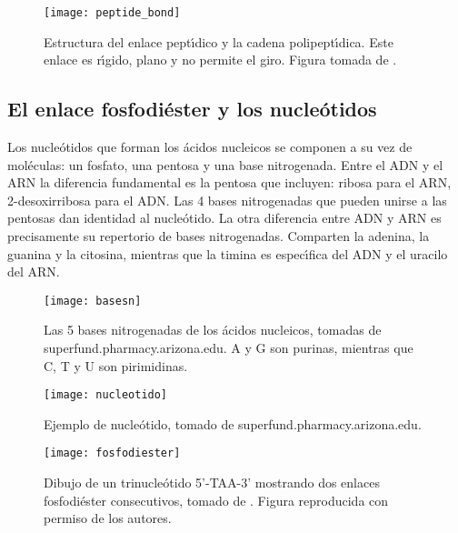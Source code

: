 \begin{figure}
\begin{center} 
\texttt{[image: peptide\_bond]}
\caption%
{
Estructura del enlace pept\'\i{}dico y la cadena polipept\'\i{}dica. Este enlace es r\'\i{}gido, plano y no permite el giro.
Figura tomada de .
}
\label{fig:peptide_bond}
\end{center}
\end{figure}



\subsection{El enlace fosfodi\'{e}ster y los nucle\'{o}tidos} \label{nts}
Los nucle\'{o}tidos que forman los \'{a}cidos nucleicos se componen a su vez de mol\'{e}culas: un fosfato, una pentosa y una 
base nitrogenada. Entre el ADN y el ARN la diferencia fundamental es la pentosa que incluyen: ribosa para el ARN, 
2-desoxirribosa para el ADN. Las 4 bases nitrogenadas que pueden unirse a las pentosas dan identidad al nucle\'{o}tido.
La otra diferencia entre ADN y ARN es precisamente su repertorio de bases nitrogenadas. Comparten la adenina, la 
guanina y la citosina, mientras que la timina es espec\'\i{}fica del ADN y el uracilo del ARN.

\begin{figure}
\begin{center} 
\texttt{[image: basesn]}
\caption%
{
Las 5 bases nitrogenadas de los \'{a}cidos nucleicos, tomadas de superfund.pharmacy.arizona.edu.
A y G son purinas, mientras que C, T y U son pirimidinas.
}
\label{fig:basesn}
\end{center}
\end{figure}

\begin{figure}
\begin{center} 
\texttt{[image: nucleotido]}
\caption%
{
Ejemplo de nucle\'{o}tido, tomado de superfund.pharmacy.arizona.edu.
}
\label{fig:nucleotido}
\end{center}
\end{figure}

\begin{figure}
\begin{center} 
\texttt{[image: fosfodiester]}
\caption%
{
Dibujo de un trinucle\'{o}tido 5'-TAA-3' mostrando dos enlaces fosfodi\'{e}ster consecutivos, 
tomado de .
Figura reproducida con permiso de los autores.
}
\label{fig:fosfodiester}
\end{center}
\end{figure}

